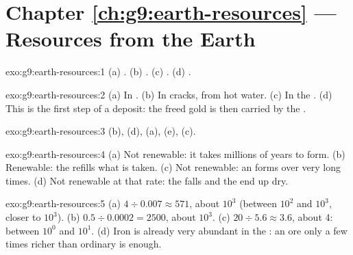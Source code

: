 \section*{Chapter \ref{ch:g9:earth-resources} --- Resources from the Earth}

\begin{solution}{exo:g9:earth-resources:1}
(a) . (b) . (c) . (d) .
\end{solution}

\begin{solution}{exo:g9:earth-resources:2}
(a) In  . (b) In cracks, from hot water. (c) In the .
(d) This is the first step of a  deposit: the freed gold is
then carried by the .
\end{solution}

\begin{solution}{exo:g9:earth-resources:3}
(b), (d), (a), (e), (c).
\end{solution}

\begin{solution}{exo:g9:earth-resources:4}
(a) Not renewable: it takes millions of years to form. (b) Renewable: the
 refills what is taken. (c) Not renewable: an  forms over
very long times. (d) Not renewable at that rate: the  falls and
the  end up dry.
\end{solution}

\begin{solution}{exo:g9:earth-resources:5}
(a) $4 \div 0.007 \approx 571$, about $10^3$ (between $10^2$ and $10^3$,
closer to $10^3$). (b) $0.5 \div 0.0002 = 2500$, about $10^3$. (c) $20
\div 5.6 \approx 3.6$, about 4: between $10^0$ and $10^1$.
(d) Iron is already very abundant in the : an ore only a few times
richer than ordinary  is enough.
\end{solution}

